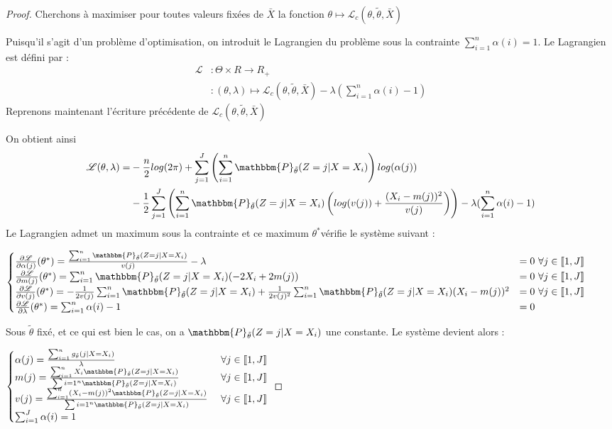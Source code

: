 \documentclass[frenchb]{report}
\newcommand{\1}{\mathbbm{1}}
\newcommand{\prob}{\mathbbm{P}}
\newcommand{\lv}{\mathcal{L}}
\newcommand{\thetat}{\tilde{\theta}}
\theoremstyle{definition}\newtheorem{defn}{Définition}
\theoremstyle{definition}\newtheorem{exm}{Exemple}
\theoremstyle{definition}\newtheorem{nota}{Notation}
\theoremstyle{definition}\newtheorem{rem}{Remarque}
\begin{document}
\begin{proof}
Cherchons à maximiser pour toutes valeurs fixées de $\bar{X}$ la fonction $\theta \mapsto \lv_{c}(\theta,\thetat,\bar{X})$

Puisqu'il s'agit d'un problème d'optimisation, on introduit le Lagrangien du problème sous la contrainte $\sum_{i=1}^n\alpha(i) = 1$.
Le Lagrangien est défini par : 
\begin{align*}
\lv &: \Theta \times R \rightarrow R_+\\
&:(\theta,\lambda) \mapsto \lv_c(\theta,\thetat,\bar{X}) - \lambda(\sum_{i=1}^n\alpha(i)-1)
\end{align*}
Reprenons maintenant l'écriture précédente de $\lv_c(\theta,\thetat,\bar{X})$

On obtient ainsi 
\begin{align*}
\lv(\theta,\lambda) = &-\frac{n}{2}log(2\pi)+\sum_{j=1}^J \left(\sum_{i = 1}^n  \prob_{\thetat}(Z=j|X=X_i)\right) log(\alpha(j))\\
&-\frac{1}{2}\sum_{j=1}^J\left(\sum_{i=1}^n \prob_{\thetat}(Z=j|X=X_i)\left(log(v(j))+\frac{(X_i-m(j))^2}{v(j)}\right)\right) - \lambda(\sum_{i=1}^n\alpha(i)-1)
\end{align*}
Le Lagrangien admet un maximum sous la contrainte et ce maximum $\theta^*$vérifie le système suivant :

$
\begin{cases}
\frac{\partial \lv}{\partial \alpha(j)} (\theta^*) = \frac{\sum_{i=1}^n \prob_{\thetat}(Z=j|X=X_i)}{v(j)} - \lambda &=0 \text{ } \forall j \in \llbracket 1,J \rrbracket \\
\frac{\partial \lv}{\partial m(j)} (\theta^*) = \sum_{i=1}^n \prob_{\thetat}(Z=j|X=X_i)(-2X_i+2m(j)) &=0 \text{ } \forall j \in \llbracket 1,J \rrbracket \\
\frac{\partial \lv}{\partial v(j)} (\theta^*) = -\frac{1}{2v(j)}\sum_{i=1}^n \prob_{\thetat}(Z=j|X=X_i) + \frac{1}{2v(j)^2}\sum_{i=1}^n \prob_{\thetat}(Z=j|X=X_i)(X_i-m(j))^2 &=0 \text{ } \forall j \in \llbracket 1,J \rrbracket \\
\frac{\partial \lv}{\partial \lambda} (\theta^*) = \sum_{i=1}^n\alpha(i)-1 &=0 
\end{cases}
$

Sous $\thetat$ fixé, et ce qui est bien le cas, on a $\prob_{\thetat}(Z=j|X=X_i)$ une constante.
Le système devient alors :

$
\begin{cases}
\alpha(j) = \frac{\sum_{i=1}^n g_{\thetat}(j|X=X_i)}{\lambda} &\text{ } \forall j \in \llbracket 1,J \rrbracket \\
m(j) = \frac{\sum_{i=1}^n X_i\prob_{\thetat}(Z=j|X=X_i)}{\sum{i=1}^n \prob_{\thetat}(Z=j|X=X_i)} &\text{ } \forall j \in \llbracket 1,J \rrbracket \\
v(j) = \frac{\sum_{i=1}^n (X_i -m(j))^2 \prob_{\thetat}(Z=j|X=X_i)}{\sum{i=1}^n\prob_{\thetat}(Z=j|X=X_i)} &\text{ } \forall j \in \llbracket 1,J \rrbracket \\
\sum_{i=1}^J\alpha(i) =1 
\end{cases}
$


\end{proof}
\end{document}
